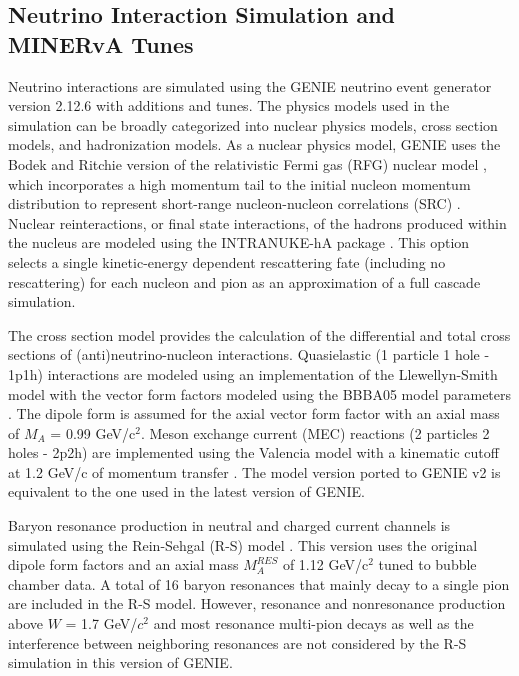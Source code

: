 \documentclass[aps, prd, twocolumn, showpacs, superscriptaddress, floatfix]{revtex4-2}
\begin{document}
\subsection{Neutrino Interaction Simulation and MINERvA Tunes}
Neutrino interactions are simulated using the GENIE neutrino event generator \cite{Andreopoulos2010} version 2.12.6 with additions and tunes. The physics models used in the simulation can be broadly categorized into nuclear physics models, cross section models, and hadronization models. As a nuclear physics model, GENIE uses the Bodek and Ritchie version of the relativistic Fermi gas (RFG) nuclear model \cite{Bodek:1980ar}, which incorporates a high momentum tail to the initial nucleon momentum distribution to represent short-range nucleon-nucleon correlations (SRC) \cite{LlewellynSmith1972}. Nuclear reinteractions, or final state interactions, of the hadrons produced within the nucleus are modeled using the INTRANUKE-hA package \cite{Dytman:2007zz}. This option selects a single kinetic-energy dependent rescattering fate (including no rescattering) for each nucleon and pion as an approximation of a full cascade simulation.

The cross section model provides the calculation of the differential and total cross sections of (anti)neutrino-nucleon interactions. Quasielastic (1 particle 1 hole - 1p1h) interactions are modeled using an implementation of the Llewellyn-Smith model \cite{LLEWELLYNSMITH1972261} with the vector form factors modeled using the BBBA05 model parameters \cite{BRADFORD2006127}. The dipole form is assumed for the axial vector form factor with an axial mass of $M_A$ = 0.99 GeV/c$^2$. Meson exchange current (MEC) reactions (2 particles 2 holes - 2p2h) are implemented using the Valencia model with a kinematic cutoff at 1.2 GeV/c of momentum transfer \cite{schwehr2017genie}. The model version ported to GENIE v2 is equivalent to the one used in the latest version of GENIE.

Baryon resonance production in neutral and charged current channels is simulated using the Rein-Sehgal (R-S) model \cite{Rein1981}. This version uses the original dipole form factors and an axial mass $M_A^{RES}$ of 1.12 GeV/c$^2$ tuned to bubble chamber data. A total of 16 baryon resonances that mainly decay to a single pion are included in the R-S model. However, resonance and nonresonance production above $W$ = 1.7 GeV/$c^2$ and most resonance multi-pion decays as well as the interference between neighboring resonances are not considered by the R-S simulation in this version of GENIE.
\end{document}
